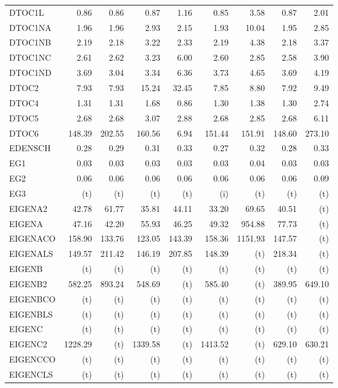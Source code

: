 \documentclass[11pt,twoside]{article}
\begin{document}
{\begin{longtable}[c]{|l|r|r|r|r|r|r|r|r|}
DTOC1L & 0.86 & 0.86 & 0.87 & 1.16 & 0.85 & 3.58 & 0.87 & 2.01 \\
DTOC1NA & 1.96 & 1.96 & 2.93 & 2.15 & 1.93 & 10.04 & 1.95 & 2.85 \\
DTOC1NB & 2.19 & 2.18 & 3.22 & 2.33 & 2.19 & 4.38 & 2.18 & 3.37 \\
DTOC1NC & 2.61 & 2.62 & 3.23 & 6.00 & 2.60 & 2.85 & 2.58 & 3.90 \\
DTOC1ND & 3.69 & 3.04 & 3.34 & 6.36 & 3.73 & 4.65 & 3.69 & 4.19 \\
DTOC2 & 7.93 & 7.93 & 15.24 & 32.45 & 7.85 & 8.80 & 7.92 & 9.49 \\
DTOC4 & 1.31 & 1.31 & 1.68 & 0.86 & 1.30 & 1.38 & 1.30 & 2.74 \\
DTOC5 & 2.68 & 2.68 & 3.07 & 2.88 & 2.68 & 2.85 & 2.68 & 6.11 \\
DTOC6 & 148.39 & 202.55 & 160.56 & 6.94 & 151.44 & 151.91 & 148.60 & 273.10 \\
EDENSCH & 0.28 & 0.29 & 0.31 & 0.33 & 0.27 & 0.32 & 0.28 & 0.33 \\
EG1 & 0.03 & 0.03 & 0.03 & 0.03 & 0.03 & 0.04 & 0.03 & 0.03 \\
EG2 & 0.06 & 0.06 & 0.06 & 0.06 & 0.06 & 0.06 & 0.06 & 0.09 \\
EG3 & (t) & (t) & (t) & (t) & (i) & (t) & (t) & (t) \\
EIGENA2 & 42.78 & 61.77 & 35.81 & 44.11 & 33.20 & 69.65 & 40.51 & (t) \\
EIGENA & 47.16 & 42.20 & 55.93 & 46.25 & 49.32 & 954.88 & 77.73 & (t) \\
EIGENACO & 158.90 & 133.76 & 123.05 & 143.39 & 158.36 & 1151.93 & 147.57 & (t) \\
EIGENALS & 149.57 & 211.42 & 146.19 & 207.85 & 148.39 & (t) & 218.34 & (t) \\
EIGENB & (t) & (t) & (t) & (t) & (t) & (t) & (t) & (t) \\
EIGENB2 & 582.25 & 893.24 & 548.69 & (t) & 585.40 & (t) & 389.95 & 649.10 \\
EIGENBCO & (t) & (t) & (t) & (t) & (t) & (t) & (t) & (t) \\
EIGENBLS & (t) & (t) & (t) & (t) & (t) & (t) & (t) & (t) \\
EIGENC & (t) & (t) & (t) & (t) & (t) & (t) & (t) & (t) \\
EIGENC2 & 1228.29 & (t) & 1339.58 & (t) & 1413.52 & (t) & 629.10 & 630.21 \\
EIGENCCO & (t) & (t) & (t) & (t) & (t) & (t) & (t) & (t) \\
EIGENCLS & (t) & (t) & (t) & (t) & (t) & (t) & (t) & (t) \\

\end{longtable}}
\end{document}
